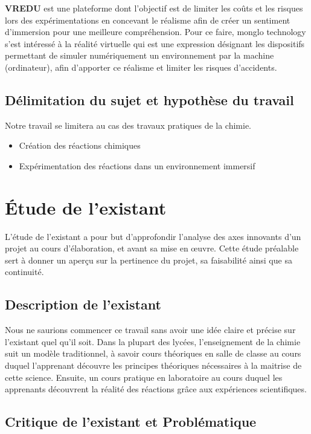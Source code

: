 \textbf{VREDU} est une plateforme dont l’objectif est de limiter les coûts et les risques lors des expérimentations en concevant le réalisme afin de créer un sentiment d’immersion pour une meilleure compréhension.
Pour ce faire, monglo technology s’est intéressé à la réalité virtuelle qui est une expression désignant les dispositifs permettant de simuler numériquement un environnement par la machine (ordinateur), afin d’apporter ce réalisme et limiter les risques d’accidents.

\subsection{Délimitation du sujet et hypothèse du travail}

Notre travail se limitera au cas des travaux pratiques de la chimie.

\begin{itemize}
	\item Création des réactions chimiques
	\item Expérimentation des réactions dans un environnement immersif
\end{itemize}

\section{Étude de l’existant}

L’étude de l’existant a pour but d'approfondir l'analyse des axes innovants d'un projet au cours d'élaboration, et avant sa mise en œuvre. Cette étude préalable sert à donner un aperçu sur la pertinence du projet, sa faisabilité ainsi que sa continuité.

\subsection{Description de l’existant}

Nous ne saurions commencer ce travail sans avoir une idée claire et précise sur l’existant quel qu’il soit.
Dans la plupart des lycées, l’enseignement de la chimie suit un modèle traditionnel, à savoir cours théoriques en salle de classe au cours duquel l’apprenant découvre les principes théoriques nécessaires à la maitrise de cette science. Ensuite, un cours pratique en laboratoire au cours duquel les apprenants découvrent la réalité des réactions grâce aux expériences scientifiques.


\subsection{Critique de l’existant et Problématique}

